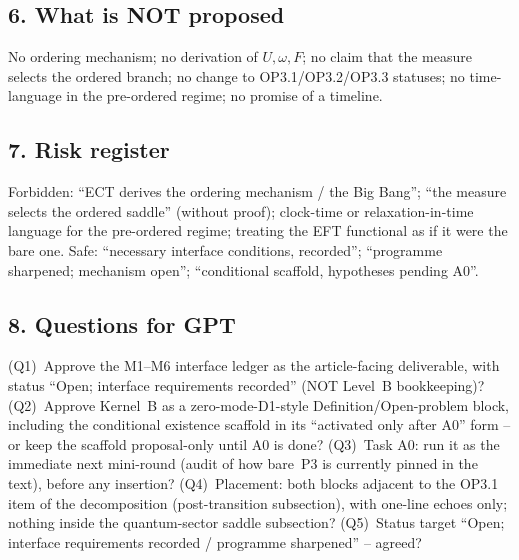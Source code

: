 \subsection*{6. What is NOT proposed}
No ordering mechanism; no derivation of $U,\omega,F$; no claim
that the measure selects the ordered branch; no change to
OP3.1/OP3.2/OP3.3 statuses; no time-language in the pre-ordered
regime; no promise of a timeline.

\subsection*{7. Risk register}
Forbidden: ``ECT derives the ordering mechanism / the Big Bang'';
``the measure selects the ordered saddle'' (without proof);
clock-time or relaxation-in-time language for the pre-ordered
regime; treating the EFT functional as if it were the bare one.
Safe: ``necessary interface conditions, recorded'';
``programme sharpened; mechanism open'';
``conditional scaffold, hypotheses pending A0''.

\subsection*{8. Questions for GPT}
(Q1)~Approve the M1--M6 interface ledger as the article-facing
deliverable, with status ``Open; interface requirements recorded''
(NOT Level~B bookkeeping)?
(Q2)~Approve Kernel~B as a zero-mode-D1-style
Definition/Open-problem block, including the conditional existence
scaffold in its ``activated only after A0'' form -- or keep the
scaffold proposal-only until A0 is done?
(Q3)~Task A0: run it as the immediate next mini-round (audit of
how bare~P3 is currently pinned in the text), before any
insertion?
(Q4)~Placement: both blocks adjacent to the OP3.1 item of the
decomposition (post-transition subsection), with one-line echoes
only; nothing inside the quantum-sector saddle subsection?
(Q5)~Status target ``Open; interface requirements recorded /
programme sharpened'' -- agreed?

